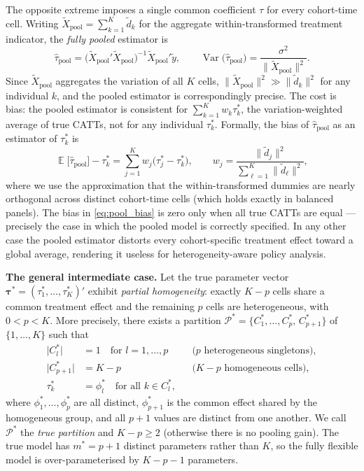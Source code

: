 \documentclass[margin=3in, 12pt]{article}
\DeclareMathOperator{\E}{\mathbb{E}}
\DeclareMathOperator{\Var}{Var}
\newcommand{\1}{\mathbbm{1}}
\newcommand{\ytd}{\tilde{y}}
\begin{document}
The opposite extreme imposes a single common coefficient $\tau$ for every
cohort-time cell.
Writing $\tilde{X}_{\text{pool}} = \sum_{k=1}^K \tilde{d}_k$ for the
aggregate within-transformed treatment indicator, the \emph{fully pooled}
estimator is
\begin{equation}
  \hat\tau_{\text{pool}}
  = \bigl(\tilde{X}_{\text{pool}}'\tilde{X}_{\text{pool}}\bigr)^{-1}
    \tilde{X}_{\text{pool}}'\ytd,
  \qquad
  \Var\!\bigl(\hat\tau_{\text{pool}}\bigr)
  = \frac{\sigma^2}{\bigl\|\tilde{X}_{\text{pool}}\bigr\|^2}.
  \label{eq:pool_var}
\end{equation}
Since $\tilde{X}_{\text{pool}}$ aggregates the variation of all $K$ cells,
$\|\tilde{X}_{\text{pool}}\|^2 \gg \|\tilde{d}_k\|^2$ for any individual
$k$, and the pooled estimator is correspondingly precise.
The cost is bias: the pooled estimator is consistent for
$\sum_{k=1}^K w_k \tau_k^*$, the variation-weighted average of true CATTs,
not for any individual $\tau_k^*$.
Formally, the bias of $\hat\tau_{\text{pool}}$ as an estimator of $\tau_k^*$ is
\begin{equation}
  \E\bigl[\hat\tau_{\text{pool}}\bigr] - \tau_k^*
  = \sum_{j=1}^K w_j\bigl(\tau_j^* - \tau_k^*\bigr),
  \qquad
  w_j = \frac{\|\tilde{d}_j\|^2}{\sum_{\ell=1}^K \|\tilde{d}_\ell\|^2},
  \label{eq:pool_bias}
\end{equation}
where we use the approximation that the within-transformed dummies are
nearly orthogonal across distinct cohort-time cells (which holds exactly in
balanced panels).
The bias in \eqref{eq:pool_bias} is zero only when all true CATTs are equal
--- precisely the case in which the pooled model is correctly specified.
In any other case the pooled estimator distorts every cohort-specific
treatment effect toward a global average, rendering it useless for
heterogeneity-aware policy analysis.

\bigskip

\noindent\textbf{The general intermediate case.}
Let the true parameter vector $\bm{\tau}^* = (\tau_1^*,\ldots,\tau_K^*)'$
exhibit \emph{partial homogeneity}: exactly $K-p$ cells share a common
treatment effect and the remaining $p$ cells are heterogeneous, with
$0 < p < K$.
More precisely, there exists a partition $\mathcal{P}^* =
\{C_1^*,\ldots,C_p^*,\, C_{p+1}^*\}$ of $\{1,\ldots,K\}$ such that
\begin{align}
  \bigl|C_l^*\bigr| &= 1 \quad \text{for } l = 1,\ldots,p
    && \text{($p$ heterogeneous singletons)},
  \label{eq:singletons}\\
  \bigl|C_{p+1}^*\bigr| &= K - p
    && \text{($K-p$ homogeneous cells)},
  \label{eq:homo_group}\\
  \tau_k^* &= \phi_l^* \quad \text{for all } k \in C_l^*,
  \label{eq:true_effects}
\end{align}
where $\phi_1^*, \ldots, \phi_p^*$ are all distinct, $\phi_{p+1}^*$ is the
common effect shared by the homogeneous group, and all $p+1$ values are
distinct from one another.
We call $\mathcal{P}^*$ the \emph{true partition} and $K - p \geq 2$
(otherwise there is no pooling gain).
The true model has $m^* = p + 1$ distinct parameters rather than $K$,
so the fully flexible model is over-parameterised by $K - p - 1$ parameters.
\end{document}
